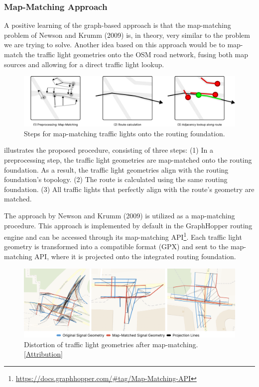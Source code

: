 \subsubsection{Map-Matching Approach}

A positive learning of the graph-based approach is that the map-matching problem of Newson and Krumm (2009) \cite{newson_hidden_2009} is, in theory, very similar to the problem we are trying to solve. Another idea based on this approach would be to map-match the traffic light geometries onto the OSM road network, fusing both map sources and allowing for a direct traffic light lookup.

\begin{figure}[htbp]
\centering
\includegraphics[width=\linewidth]{images/sg-selection-map-matching-approach.pdf}
\caption{Steps for map-matching traffic lights onto the routing foundation.}
\label{fig:sg-selection-map-matching-approach}
\end{figure}

 illustrates the proposed procedure, consisting of three steps: (1) In a preprocessing step, the traffic light geometries are map-matched onto the routing foundation. As a result, the traffic light geometries align with the routing foundation's topology. (2) The route is calculated using the same routing foundation. (3) All traffic lights that perfectly align with the route's geometry are matched.

The approach by Newson and Krumm (2009) \cite{newson_hidden_2009} is utilized as a map-matching procedure. This approach is implemented by default in the GraphHopper routing engine and can be accessed through its map-matching API\footnote{\url{https://docs.graphhopper.com/\#tag/Map-Matching-API}}. Each traffic light geometry is transformed into a compatible format (GPX) and sent to the map-matching API, where it is projected onto the integrated routing foundation.

\begin{figure}[htbp]
\centering
\includegraphics[width=\linewidth]{images/sg-selection-map-matching-fails.png}
\caption{Distortion of traffic light geometries after map-matching. [\hyperref[attribution]{Attribution}]}
\label{fig:sg-selection-map-matching-fails}
\end{figure}

